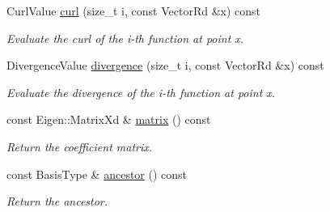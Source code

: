 \begin{DoxyCompactItemize}
Curl\+Value \hyperlink{classHArDCore2D_1_1Family_a9f44b487b46df0e9cf83b175ae0ae3b3}{curl} (size\+\_\+t i, const Vector\+Rd \&x) const
\begin{DoxyCompactList}\small\item\em Evaluate the curl of the i-\/th function at point x. \end{DoxyCompactList}\item 
\mbox{\label{classHArDCore2D_1_1Family_a86a0fd0d5391607f156b3c27be6d7164}} 
Divergence\+Value \hyperlink{classHArDCore2D_1_1Family_a86a0fd0d5391607f156b3c27be6d7164}{divergence} (size\+\_\+t i, const Vector\+Rd \&x) const
\begin{DoxyCompactList}\small\item\em Evaluate the divergence of the i-\/th function at point x. \end{DoxyCompactList}\item 
\mbox{\label{classHArDCore2D_1_1Family_aaf8f501609f30a03b0b167e381f6ac23}} 
const Eigen\+::\+Matrix\+Xd \& \hyperlink{classHArDCore2D_1_1Family_aaf8f501609f30a03b0b167e381f6ac23}{matrix} () const
\begin{DoxyCompactList}\small\item\em Return the coefficient matrix. \end{DoxyCompactList}\item 
\mbox{\label{classHArDCore2D_1_1Family_a1f618ff125041ebcfb88db2f4373d37e}} 
const Basis\+Type \& \hyperlink{classHArDCore2D_1_1Family_a1f618ff125041ebcfb88db2f4373d37e}{ancestor} () const
\begin{DoxyCompactList}\small\item\em Return the ancestor. \end{DoxyCompactList}\end{DoxyCompactItemize}
